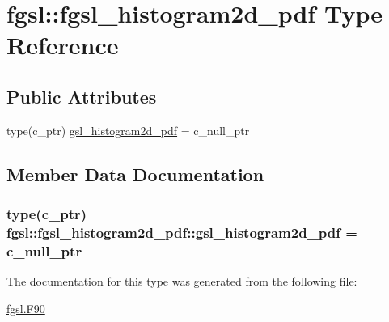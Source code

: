 \hypertarget{structfgsl_1_1fgsl__histogram2d__pdf}{}\section{fgsl\+:\+:fgsl\+\_\+histogram2d\+\_\+pdf Type Reference}
\label{structfgsl_1_1fgsl__histogram2d__pdf}
\subsection*{Public Attributes}
\begin{DoxyCompactItemize}
\item 
type(c\+\_\+ptr) \hyperlink{structfgsl_1_1fgsl__histogram2d__pdf_aea0dbd89c006ef3985c1e17c5fe88e96}{gsl\+\_\+histogram2d\+\_\+pdf} = c\+\_\+null\+\_\+ptr
\end{DoxyCompactItemize}


\subsection{Member Data Documentation}
\hypertarget{structfgsl_1_1fgsl__histogram2d__pdf_aea0dbd89c006ef3985c1e17c5fe88e96}{}
\subsubsection[{gsl\+\_\+histogram2d\+\_\+pdf}]{\setlength{\rightskip}{0pt plus 5cm}type(c\+\_\+ptr) fgsl\+::fgsl\+\_\+histogram2d\+\_\+pdf\+::gsl\+\_\+histogram2d\+\_\+pdf = c\+\_\+null\+\_\+ptr}\label{structfgsl_1_1fgsl__histogram2d__pdf_aea0dbd89c006ef3985c1e17c5fe88e96}


The documentation for this type was generated from the following file\+:\begin{DoxyCompactItemize}
\item 
\hyperlink{fgsl_8F90}{fgsl.\+F90}\end{DoxyCompactItemize}
